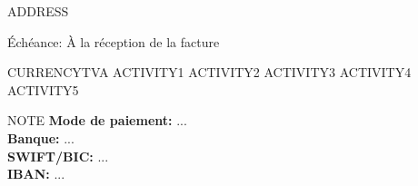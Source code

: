 \documentclass{letter}
\date{Date de facturation: DATE \\
      Facture Numéro: 2020 - 
      COUNTER
      }
\begin{document}
  \begin{letter}{ 
  ADDRESS
  }         
    \opening{Échéance: À la réception de la facture}
    \begin{invoice}{CURRENCY}{TVA}
	ACTIVITY1
	ACTIVITY2
	ACTIVITY3
	ACTIVITY4
	ACTIVITY5
    \end{invoice}
    NOTE
    \vspace{.5cm}
    \textbf{Mode de paiement:} ...\\
    \textbf{Banque:} ...\\
    \textbf{SWIFT/BIC:} ...\\
    \textbf{IBAN:} ...\\
  \end{letter}
\end{document}
